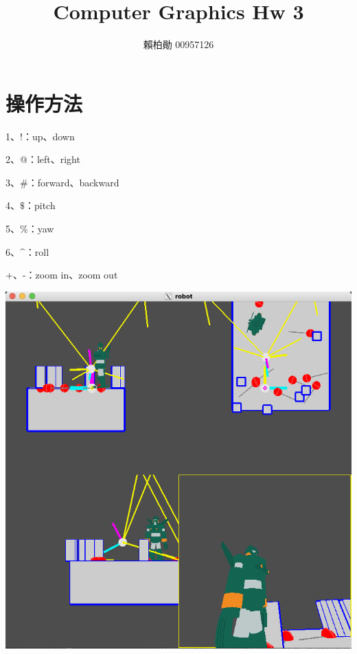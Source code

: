 \documentclass[a4,12pt]{article}
\title{Computer Graphics Hw 3}
\author{賴柏勛 00957126}
\begin{document}
    \maketitle
    \section{操作方法}

    1、!：up、down

    2、@：left、right

    3、\#：forward、backward

    4、$\$$：pitch

    5、$\%$：yaw

    6、$\^$：roll

    +、-：zoom in、zoom out
   
    \includegraphics[scale=0.3]{pic.png}
\end{document}
